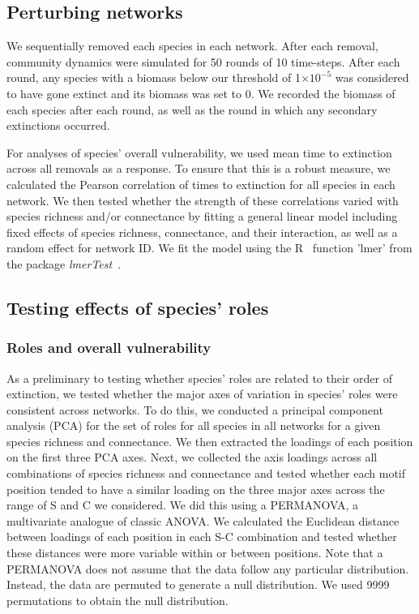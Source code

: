 \documentclass[12pt]{article}
\begin{document}
	\subsection*{Perturbing networks}

		We sequentially removed each species in each network. After each removal, community dynamics were simulated for 50 rounds of 10 time-steps. After each round, any species with a biomass below our threshold of 1$\times10^{-5}$ was considered to have gone extinct and its biomass was set to 0. We recorded the biomass of each species after each round, as well as the round in which any secondary extinctions occurred.


		For analyses of species' overall vulnerability, we used mean time to extinction across all removals as a response. To ensure that this is a robust measure, we calculated the Pearson correlation of times to extinction for all species in each network. We then tested whether the strength of these correlations varied with species richness and/or connectance by fitting a general linear model including fixed effects of species richness, connectance, and their interaction, as well as a random effect for network ID. We fit the model using the R~\citep{R} function 'lmer' from the package \emph{lmerTest}~\citep{lmerTest}.


	\subsection*{Testing effects of species' roles}

		\subsubsection*{Roles and overall vulnerability}

			As a preliminary to testing whether species' roles are related to their order of extinction, we tested whether the major axes of variation in species' roles were consistent across networks. To do this, we conducted a principal component analysis (PCA) for the set of roles for all species in all networks for a given species richness and connectance. We then extracted the loadings of each position on the first three PCA axes. Next, we collected the axis loadings across all combinations of species richness and connectance and tested whether each motif position tended to have a similar loading on the three major axes across the range of S and C we considered. We did this using a PERMANOVA, a multivariate analogue of classic ANOVA. We calculated the Euclidean distance between loadings of each position in each S-C combination and tested whether these distances were more variable within or between positions. Note that a PERMANOVA does not assume that the data follow any particular distribution. Instead, the data are permuted to generate a null distribution. We used 9999 permutations to obtain the null distribution.
\end{document}
